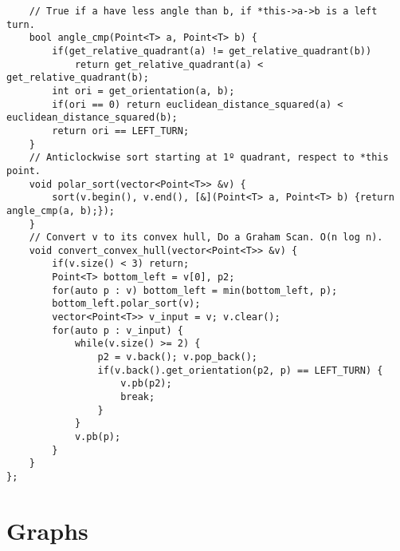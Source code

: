 \documentclass[a4paper,10pt]{article}
\begin{document}
    \begin{verbatim}
    // True if a have less angle than b, if *this->a->b is a left turn.
    bool angle_cmp(Point<T> a, Point<T> b) {
        if(get_relative_quadrant(a) != get_relative_quadrant(b)) 
            return get_relative_quadrant(a) < get_relative_quadrant(b);
        int ori = get_orientation(a, b);
        if(ori == 0) return euclidean_distance_squared(a) < euclidean_distance_squared(b);
        return ori == LEFT_TURN;
    }
    // Anticlockwise sort starting at 1º quadrant, respect to *this point.
    void polar_sort(vector<Point<T>> &v) {
        sort(v.begin(), v.end(), [&](Point<T> a, Point<T> b) {return angle_cmp(a, b);});
    }
    // Convert v to its convex hull, Do a Graham Scan. O(n log n).
    void convert_convex_hull(vector<Point<T>> &v) {
        if(v.size() < 3) return;
        Point<T> bottom_left = v[0], p2;
        for(auto p : v) bottom_left = min(bottom_left, p);
        bottom_left.polar_sort(v);
        vector<Point<T>> v_input = v; v.clear();
        for(auto p : v_input) {
            while(v.size() >= 2) {
                p2 = v.back(); v.pop_back();
                if(v.back().get_orientation(p2, p) == LEFT_TURN) {
                    v.pb(p2);
                    break;
                }
            }
            v.pb(p);
        }
    }
};
\end{verbatim}

\section*{Graphs}
\end{document}
